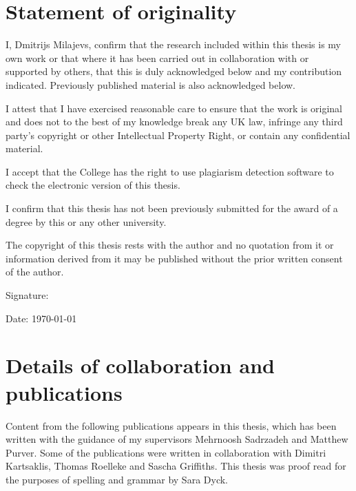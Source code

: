 \chapter*{Statement of originality}

I, Dmitrijs Milajevs, confirm that the research included within this thesis is my own work or that where it has been carried out in collaboration with or supported by others, that this is duly acknowledged below and my contribution indicated. Previously published material is also acknowledged below.

I attest that I have exercised reasonable care to ensure that the work is original and does not to the best of my knowledge break any UK law, infringe any third party’s copyright or other Intellectual Property Right, or contain any confidential material.

I accept that the College has the right to use plagiarism detection software to check the electronic version of this thesis.

I confirm that this thesis has not been previously submitted for the award of a degree by this or any other university.

The copyright of this thesis rests with the author and no quotation from it or information derived from it may be published without the prior written consent of the author.

Signature: %

Date: \today

\chapter*{Details of collaboration and publications}

Content from the following publications appears in this thesis, which has been written with the guidance of my supervisors Mehrnoosh Sadrzadeh and Matthew Purver. Some of the publications were written in collaboration with Dimitri Kartsaklis, Thomas Roelleke and Sascha Griffiths. This thesis was proof read for the purposes of spelling and grammar by Sara Dyck.

